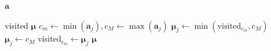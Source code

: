 \begin{algorithm}[htbp]
\begin{algorithmic}[1]
\Require $\bm{a}$ 

\State visited 
\State $\bm{\mu}$ 
    \State $c_m \gets \min(\bm{a}_j), c_M \gets \max(\bm{a}_j)$
        \State $\bm{\mu}_j \gets \min(\text{visited}_{c_m}, c_M)$ 
    \Else
        \State $\bm{\mu}_j \gets c_M$ 
    \EndIf
    \State visited$_{c_m} \gets \bm{\mu}_j$
\EndFor
\State \Return $\bm{\mu}$
\end{algorithmic}
\caption{Ancestry sorting without parent labels.}
\label{alg:order_cherries}
\end{algorithm}